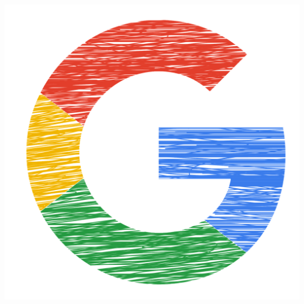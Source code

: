 \documentclass[]{mdkrause_cv_openfont}
\begin{document}
\begin{minipage}[t]{1\textwidth}
\href{https://about.me/matheusdalsentekrause}{\includegraphics[scale=0.025]{./logos/g.png}} 

\end{minipage} 
\end{document}
